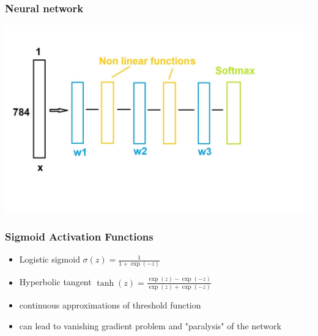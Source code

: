 \documentclass[fullscreen=true, bookmarks=true, hyperref={pdfencoding=unicode}]{beamer}
\begin{document}
\begin{frame}
  \frametitle{Neural network}

  \begin{center}
    \includegraphics[keepaspectratio, width=\paperwidth]{nn_scheme.jpg}
  \end{center}
\end{frame}


\begin{frame}
\frametitle{Sigmoid Activation Functions}
   \begin{itemize}
     \item Logistic sigmoid
     $\sigma(z) = \frac{1}{1+\exp(-z)}$

     \pause
     \item Hyperbolic tangent
     $\tanh(z) = \frac{\exp(z)-\exp(-z)}{\exp(z)+\exp(-z)}$

     \pause
     \item continuous approximations of threshold function
     
     \pause
     \item can lead to vanishing gradient problem and "paralysis" of the network
   \end{itemize}
\end{frame}





\end{document}
